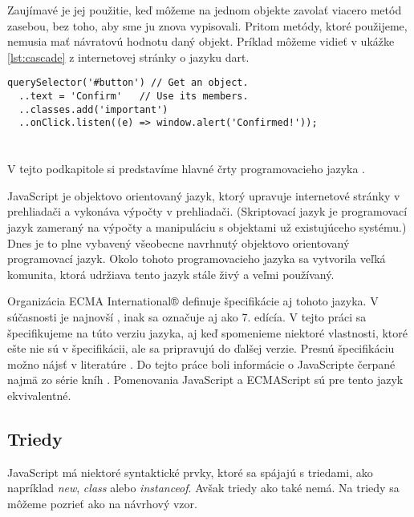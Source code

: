 Zaujímavé je jej použitie, keď môžeme na jednom objekte zavolať viacero metód zasebou, bez toho, aby sme ju znova vypisovali. Pritom metódy, ktoré použijeme, nemusia mať návratovú hodnotu daný objekt. Príklad môžeme vidieť v ukážke \ref{lst:cascade} z internetovej stránky o jazyku dart\cite{dartLanguageTour}.

\begin{lstlisting}[caption=Kaskádová notácia, label={lst:cascade}]
querySelector('#button') // Get an object.
  ..text = 'Confirm'   // Use its members.
  ..classes.add('important')
  ..onClick.listen((e) => window.alert('Confirmed!'));
\end{lstlisting}







\section{\JS{}}
V tejto podkapitole si predstavíme hlavné črty programovacieho jazyka \JS{}. 

JavaScript je objektovo orientovaný jazyk, ktorý upravuje internetové stránky v prehliadači a vykonáva výpočty v prehliadači.
(Skriptovací jazyk je programovací jazyk zameraný na výpočty a manipuláciu s objektami už existujúceho systému.)
Dnes je to plne vybavený všeobecne navrhnutý objektovo orientovaný programovací jazyk.
Okolo tohoto programovacieho jazyka sa vytvorila veľká komunita, ktorá udržiava tento jazyk stále živý a veľmi používaný.

Organizácia {ECMA International®} definuje špecifikácie aj tohoto jazyka. V súčasnosti je najnovší \JS{}, inak sa označuje aj ako 7. edícía. V tejto práci sa špecifikujeme na túto verziu jazyka, aj keď spomenieme niektoré vlastnosti, ktoré ešte nie sú v špecifikácii, ale sa pripravujú do ďalšej verzie. Presnú špecifikáciu možno nájsť v literatúre \cite[\JS{}]{ECMAScript}.
Do tejto práce boli informácie o JavaScripte čerpané najmä zo série kníh \cite[You Don't Know JS]{youDontKnowJS1, youDontKnowJS2, youDontKnowJS3, youDontKnowJS4, youDontKnowJS5, youDontKnowJS6}.
Pomenovania JavaScript a ECMAScript sú pre tento jazyk ekvivalentné.

\subsection{Triedy}
JavaScript má niektoré syntaktické prvky, ktoré sa spájajú s triedami, ako napríklad \emph{new}, \emph{class} alebo \emph{instanceof}. Avšak triedy ako také nemá. Na triedy sa môžeme pozrieť ako na návrhový vzor. 

